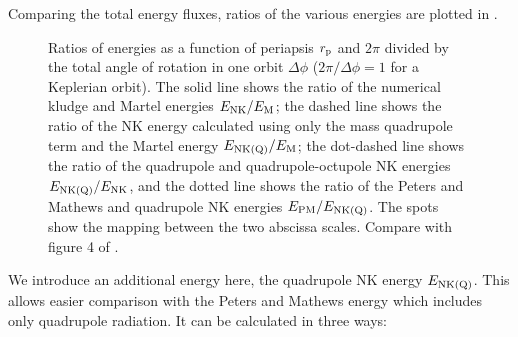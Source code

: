 Comparing the total energy fluxes, ratios of the various energies are plotted in .
\begin{figure}%
  \begin{center}
    \quad
    \caption{Ratios of energies as a function of periapsis $r_\mathrm{p}$ and $2\pi$ divided by the total angle of rotation in one orbit $\Delta\phi$ ($2\pi/\Delta\phi = 1$ for a Keplerian orbit). The solid line shows the ratio of the numerical kludge and Martel energies $E_\mathrm{NK}/E_\mathrm{M}$; the dashed line shows the ratio of the NK energy calculated using only the mass quadrupole term and the Martel energy $E_\mathrm{NK(Q)}/E_\mathrm{M}$; the dot-dashed line shows the ratio of the quadrupole and quadrupole-octupole NK energies $E_\mathrm{NK(Q)}/E_\mathrm{NK}$, and the dotted line shows the ratio of the Peters and Mathews and quadrupole NK energies $E_\mathrm{PM}/E_\mathrm{NK(Q)}$. The spots show the mapping between the two abscissa scales. Compare with figure 4 of \citet{Gair2005}.\label{fig:Energy_ratio}}
  \end{center}
\end{figure}
We introduce an additional energy here, the quadrupole NK energy $E_\mathrm{NK(Q)}$. This allows easier comparison with the Peters and Mathews energy which includes only quadrupole radiation. It can be calculated in three ways:
